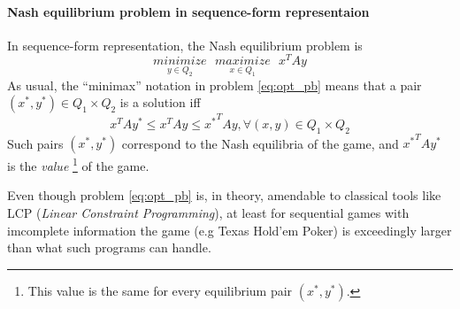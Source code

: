 \documentclass{article} %
\begin{document}
\paragraph{Nash equilibrium problem in sequence-form representaion}
In sequence-form representation, the Nash equilibrium problem is
\begin{equation}
  \underset{y \in Q_2}{minimize}\text{ }\underset{x \in Q_1}{maximize}\text{ }{x^TAy}
  \label{eq:opt_pb}
\end{equation}
As usual, the ``minimax'' notation in problem \eqref{eq:opt_pb} means that a pair $(x^*, y^*) \in Q_1 \times Q_2$ is a solution iff
\begin{equation}
  x^TAy^* \le x^TAy \le {x^*}^TAy, \forall (x, y) \in Q_1 \times Q_2
\end{equation}
Such pairs $(x^*, y^*)$ correspond to the Nash equilibria of the game, and ${x^*}^TAy^*$ is the \textit{value}
\footnote{This value is the same for every equilibrium pair $(x^*, y^*)$.} of the game.
  
Even though problem \eqref{eq:opt_pb} is, in theory, amendable to classical tools like LCP (\textit{Linear Constraint Programming}), at least for sequential games with imcomplete information the game (e.g Texas Hold'em Poker) is exceedingly larger than what such programs can handle.
\end{document}
